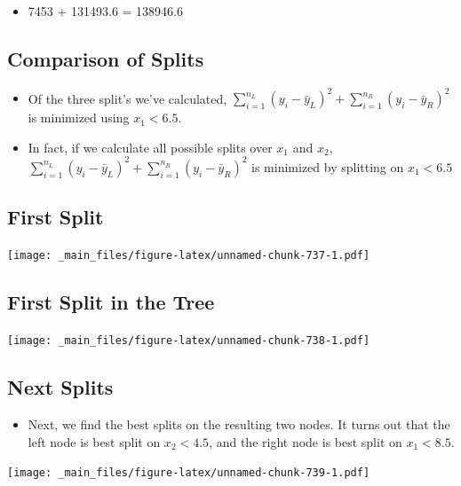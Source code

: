 \documentclass[]{book}
\providecommand{\tightlist}{%
  \setlength{\itemsep}{0pt}\setlength{\parskip}{0pt}}
\begin{document}
\begin{itemize}
\tightlist
\item
  7453 + 131493.6 = 138946.6
\end{itemize}

\subsection{Comparison of Splits}\label{comparison-of-splits}

\begin{itemize}
\item
  Of the three split's we've calculated,
  \(\displaystyle\sum_{i=1}^{n_L} (y_i -\bar{y}_L)^2 + \displaystyle\sum_{i=1}^{n_R} (y_i -\bar{y}_R)^2\)
  is minimized using \(x_1 < 6.5\).
\item
  In fact, if we calculate all possible splits over \(x_1\) and \(x_2\),
  \(\displaystyle\sum_{i=1}^{n_L} (y_i -\bar{y}_L)^2 + \displaystyle\sum_{i=1}^{n_R} (y_i -\bar{y}_R)^2\)
  is minimized by splitting on \(x_1 < 6.5\)
\end{itemize}

\subsection{First Split}\label{first-split}

\texttt{[image: \_main\_files/figure-latex/unnamed-chunk-737-1.pdf]}

\subsection{First Split in the Tree}\label{first-split-in-the-tree}

\texttt{[image: \_main\_files/figure-latex/unnamed-chunk-738-1.pdf]}

\subsection{Next Splits}\label{next-splits}

\begin{itemize}
\tightlist
\item
  Next, we find the best splits on the resulting two nodes. It turns out
  that the left node is best split on \(x_2 < 4.5\), and the right node
  is best split on \(x_1 < 8.5\).
\end{itemize}

\texttt{[image: \_main\_files/figure-latex/unnamed-chunk-739-1.pdf]}
\end{document}
